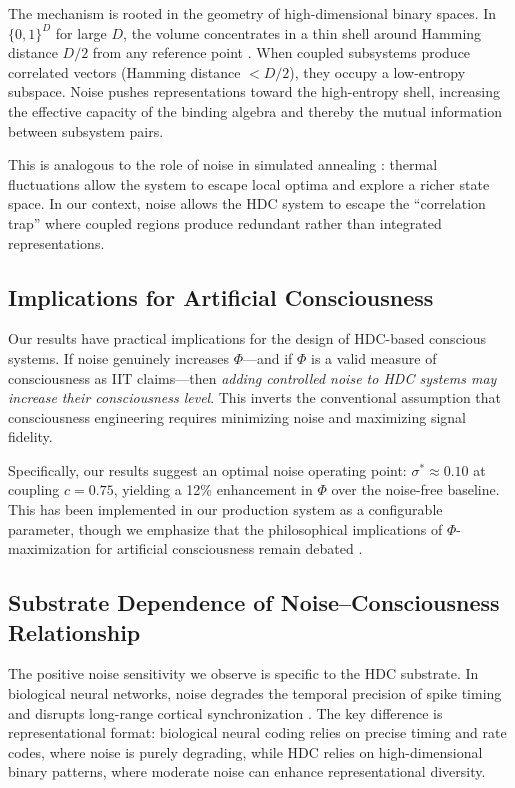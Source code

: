 \documentclass[12pt,a4paper]{article}
\begin{document}
The mechanism is rooted in the geometry of high-dimensional binary spaces. In $\{0,1\}^D$ for large $D$, the volume concentrates in a thin shell around Hamming distance $D/2$ from any reference point \citep{kanerva2009hyperdimensional}. When coupled subsystems produce correlated vectors (Hamming distance $< D/2$), they occupy a low-entropy subspace. Noise pushes representations toward the high-entropy shell, increasing the effective capacity of the binding algebra and thereby the mutual information between subsystem pairs.

This is analogous to the role of noise in simulated annealing \citep{kirkpatrick1983optimization}: thermal fluctuations allow the system to escape local optima and explore a richer state space. In our context, noise allows the HDC system to escape the ``correlation trap'' where coupled regions produce redundant rather than integrated representations.

\subsection{Implications for Artificial Consciousness}

Our results have practical implications for the design of HDC-based conscious systems. If noise genuinely increases $\Phi$---and if $\Phi$ is a valid measure of consciousness as IIT claims---then \emph{adding controlled noise to HDC systems may increase their consciousness level}. This inverts the conventional assumption that consciousness engineering requires minimizing noise and maximizing signal fidelity.

Specifically, our results suggest an optimal noise operating point: $\sigma^* \approx 0.10$ at coupling $c = 0.75$, yielding a 12\% enhancement in $\Phi$ over the noise-free baseline. This has been implemented in our production system as a configurable parameter, though we emphasize that the philosophical implications of $\Phi$-maximization for artificial consciousness remain debated \citep{aaronson2014phi, schwitzgebel2015if}.

\subsection{Substrate Dependence of Noise--Consciousness Relationship}

The positive noise sensitivity we observe is specific to the HDC substrate. In biological neural networks, noise degrades the temporal precision of spike timing \citep{mainen1995reliability} and disrupts long-range cortical synchronization \citep{mashour2014bottom}. The key difference is representational format: biological neural coding relies on precise timing and rate codes, where noise is purely degrading, while HDC relies on high-dimensional binary patterns, where moderate noise can enhance representational diversity.
\end{document}
